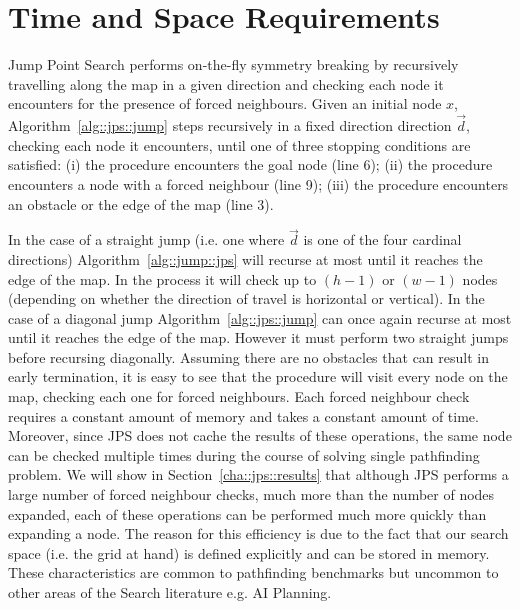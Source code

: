 \section{Time and Space Requirements}
Jump Point Search performs on-the-fly symmetry breaking by recursively travelling
along the map in a given direction and checking each node it encounters for the
presence of forced neighbours. 
Given an initial node $x$, Algorithm~\ref{alg::jps::jump} steps recursively in
a fixed direction direction $\vec{d}$, checking each node it encounters, 
until one of three stopping conditions are satisfied: 
(i) the procedure encounters the goal node (line 6); 
(ii) the procedure encounters a node with a forced neighbour (line 9); 
(iii) the procedure encounters an obstacle or the edge of the map (line 3).  

In the case of a straight jump
(i.e. one where $\vec{d}$ is one of the four cardinal directions)
Algorithm~\ref{alg::jump::jps} will recurse at most until it reaches the edge of
the map. In the process it will check up to $(h-1)$ or $(w-1)$ nodes 
(depending on whether the direction of travel is horizontal or vertical).
In the case of a diagonal jump Algorithm~\ref{alg::jps::jump} can once again
recurse at most until it reaches the edge of the map. However it must perform two 
straight jumps before recursing diagonally. Assuming there are no obstacles that
can result in early termination, it is easy to see that the procedure will visit
every node on the map, checking each one for forced neighbours. 
Each forced neighbour check requires a constant amount of memory and takes a constant
amount of time. Moreover, since JPS does not cache the results of these operations, 
the same node can be checked multiple times during the course of solving single 
pathfinding problem. We will show in Section~\ref{cha::jps::results}
that although JPS performs a large number of forced neighbour checks, much more than
the number of nodes expanded, each of these operations can be performed much more 
quickly than expanding a node. The reason for this efficiency is due to the fact that
our search space (i.e. the grid at hand) is defined explicitly and can be stored
in memory. These characteristics are common to pathfinding benchmarks but uncommon 
to other areas of the Search literature e.g. AI Planning. 
